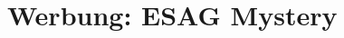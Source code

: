 \newpage
\section{Werbung: ESAG Mystery}
\label{sec:esagmystery}
\charaktere{-}
\setting{-}
\sound{-}
\licht{-}
\requisiten{-}
